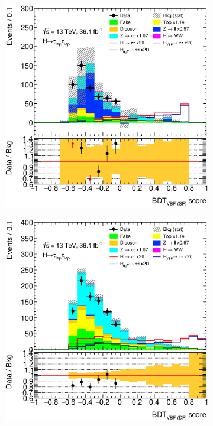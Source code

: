\begin{figure}[htb]
    \centering
    \begin{subfigure}[t]{0.45\textwidth}
        \includegraphics[width=\textwidth]{./plots/mva/modeling/BDT/SR/eemm-CutMVAVBFCatSF-BDT_VBF_SF-lin.eps}
    \end{subfigure}
    \begin{subfigure}[t]{0.45\textwidth}
        \includegraphics[width=\textwidth]{./plots/mva/modeling/BDT/SR/emme-CutMVAVBFCatDF-BDT_VBF_DF-lin.eps}

\end{subfigure}
\end{figure}

